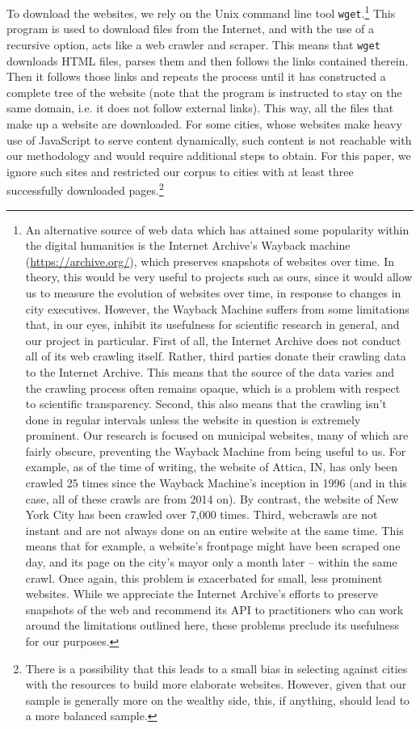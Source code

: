 \documentclass[11pt]{article}
\begin{document}
To download the websites, we rely on the Unix command line tool \texttt{wget}.\footnote{An alternative source of web data which has attained some popularity within the digital humanities is the Internet Archive's Wayback machine (\url{https://archive.org/}), which preserves snapshots of websites over time. In theory, this would be very useful to projects such as ours, since it would allow us to measure the evolution of websites over time, in response to changes in city executives. However, the Wayback Machine suffers from some limitations that, in our eyes, inhibit its usefulness for scientific research in general, and our project in particular. First of all, the Internet Archive does not conduct all of its web crawling itself. Rather, third parties donate their crawling data to the Internet Archive. This means that the source of the data varies and the crawling process often remains opaque, which is a problem with respect to scientific transparency. Second, this also means that the crawling isn’t done in regular intervals unless the website in question is extremely prominent. Our research is focused on municipal websites, many of which are fairly obscure, preventing the Wayback Machine from being useful to us. For example, as of the time of writing, the website of Attica, IN, has only been crawled 25 times since the Wayback Machine's inception in 1996 (and in this case, all of these crawls are from 2014 on). By contrast, the website of New York City has been crawled over 7,000 times. Third, webcrawls are not instant and are not always done on an entire website at the same time. This means that for example, a website's frontpage might have been scraped one day, and its page on the city's mayor only a month later -- within the same crawl. Once again, this problem is exacerbated for small, less prominent websites. While we appreciate the Internet Archive's efforts to preserve snapshots of the web and recommend its API to practitioners who can work around the limitations outlined here, these problems preclude its usefulness for our purposes.} This program is used to download files from the Internet, and with the use of a recursive option, acts like a web crawler and scraper. This means that \texttt{wget} downloads HTML files, parses them and then follows the links contained therein. Then it follows those links and repeats the process until it has constructed a complete tree of the website (note that the program is instructed to stay on the same domain, i.e. it does not follow external links). This way, all the files that make up a website are downloaded. For some cities, whose websites make heavy use of JavaScript to serve content dynamically, such content is not reachable with our methodology and would require additional steps to obtain. For this paper, we ignore such sites and restricted our corpus to cities with at least three successfully downloaded pages.\footnote{There is a possibility that this leads to a small bias in selecting against cities with the resources to build more elaborate websites. However, given that our sample is generally more on the wealthy side, this, if anything, should lead to a more balanced sample.}
\end{document}

